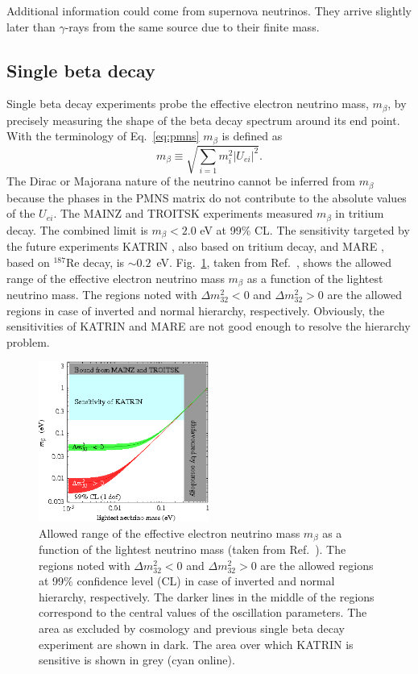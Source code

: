 Additional information could come from supernova neutrinos.
They arrive slightly later than $\gamma$-rays from the same
source due to their finite mass.

\subsection{Single beta decay}
\label{sec:sbd}
Single beta decay experiments probe the effective electron neutrino
mass, $m_{\beta}$, by precisely measuring the shape of the beta decay
spectrum around its end point. With the terminology of
Eq.~\ref{eq:pmns} $m_{\beta}$ is defined as
\begin{equation}
  \label{eq:m1b}
  m_{\beta} \equiv \sqrt{\sum_{i=1}m_{i}^{2}|U_{ei}|^{2}}.
\end{equation}
The Dirac or Majorana nature of the neutrino cannot be inferred from
$m_{\beta}$ because the phases in the PMNS matrix do not contribute to
the absolute values of the $U_{ei}$. The MAINZ \cite{Mai99} and
TROITSK \cite{Tro99} experiments measured $m_{\beta}$ in tritium
decay. The combined limit is $m_{\beta} < 2.0$ eV at 99\% CL. The
sensitivity targeted by the future experiments KATRIN \cite{Kat01},
also based on tritium decay, and MARE \cite{Mar05}, based on
$^{187}$Re decay, is $\sim 0.2$~eV. Fig.~\ref{fig:m1bVSlightest},
taken from Ref.~\cite{Str05}, shows the allowed range of the effective
electron neutrino mass $m_{\beta}$ as a function of the lightest
neutrino mass. The regions noted with $\Delta m^{2}_{32}<0$ and
$\Delta m^{2}_{32}>0$ are the allowed regions in case of inverted and
normal hierarchy, respectively. Obviously, the sensitivities of KATRIN
and MARE are not good enough to resolve the hierarchy problem.
\begin{figure}[tbhp]
\centering
\includegraphics[width=0.5\textwidth]{m1bVSlightest}  
\caption{Allowed range of the effective electron neutrino mass
$m_{\beta}$ as a function of the lightest neutrino mass (taken from
Ref.~\cite{Str05}). The regions noted with $\Delta m^{2}_{32}<0$ and
$\Delta m^{2}_{32}>0$ are the allowed regions at 99\% confidence level
(CL) in case of inverted and normal hierarchy, respectively. The
darker lines in the middle of the regions correspond to the central
values of the oscillation parameters. The area as excluded by
cosmology and previous single beta decay experiment are shown in
dark. The area over which KATRIN is sensitive is shown in grey (cyan
online).}
\label{fig:m1bVSlightest}
\end{figure}

